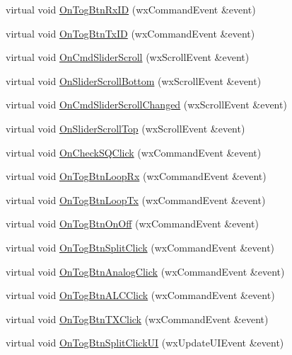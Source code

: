 \begin{DoxyCompactItemize}
\item 
virtual void \hyperlink{class_top_frame_abecf92c946e342c33afdb164e91dfc74}{On\-Tog\-Btn\-Rx\-I\-D} (wx\-Command\-Event \&event)
\item 
virtual void \hyperlink{class_top_frame_aa856acd0a0bc52635485b7ef8a6845d3}{On\-Tog\-Btn\-Tx\-I\-D} (wx\-Command\-Event \&event)
\item 
virtual void \hyperlink{class_top_frame_a39dca1a19cf1c237b8021dba4076f2ae}{On\-Cmd\-Slider\-Scroll} (wx\-Scroll\-Event \&event)
\item 
virtual void \hyperlink{class_top_frame_a396019a3b0ff107eab1bf80b4f776a18}{On\-Slider\-Scroll\-Bottom} (wx\-Scroll\-Event \&event)
\item 
virtual void \hyperlink{class_top_frame_a09ae230ed88b1230e42e891e92b95b1d}{On\-Cmd\-Slider\-Scroll\-Changed} (wx\-Scroll\-Event \&event)
\item 
virtual void \hyperlink{class_top_frame_add7272e7926661e4766572a5f3b39d70}{On\-Slider\-Scroll\-Top} (wx\-Scroll\-Event \&event)
\item 
virtual void \hyperlink{class_top_frame_a450fef86926774a21a5ea9cff84a5aa0}{On\-Check\-S\-Q\-Click} (wx\-Command\-Event \&event)
\item 
virtual void \hyperlink{class_top_frame_adc383bf9189faca9399c5f13a338fef7}{On\-Tog\-Btn\-Loop\-Rx} (wx\-Command\-Event \&event)
\item 
virtual void \hyperlink{class_top_frame_ac79cb7f583b9758fb3fd969abe526276}{On\-Tog\-Btn\-Loop\-Tx} (wx\-Command\-Event \&event)
\item 
virtual void \hyperlink{class_top_frame_adf37ba3f68b44511ab4f479482693d17}{On\-Tog\-Btn\-On\-Off} (wx\-Command\-Event \&event)
\item 
virtual void \hyperlink{class_top_frame_a497486f3a9da3eb9037575b8a7bd280c}{On\-Tog\-Btn\-Split\-Click} (wx\-Command\-Event \&event)
\item 
virtual void \hyperlink{class_top_frame_ab566e52bc9e8e09bec02fdf5f1ecdaf2}{On\-Tog\-Btn\-Analog\-Click} (wx\-Command\-Event \&event)
\item 
virtual void \hyperlink{class_top_frame_a5ee807cd9f43de8f9cb6c100feab9f22}{On\-Tog\-Btn\-A\-L\-C\-Click} (wx\-Command\-Event \&event)
\item 
virtual void \hyperlink{class_top_frame_a4ecd076a7c6a7c0285b3cdba51d37ace}{On\-Tog\-Btn\-T\-X\-Click} (wx\-Command\-Event \&event)
\item 
virtual void \hyperlink{class_top_frame_ae52f1a41bef6b1d627b0d4b33b1baa12}{On\-Tog\-Btn\-Split\-Click\-U\-I} (wx\-Update\-U\-I\-Event \&event)

\end{DoxyCompactItemize}
